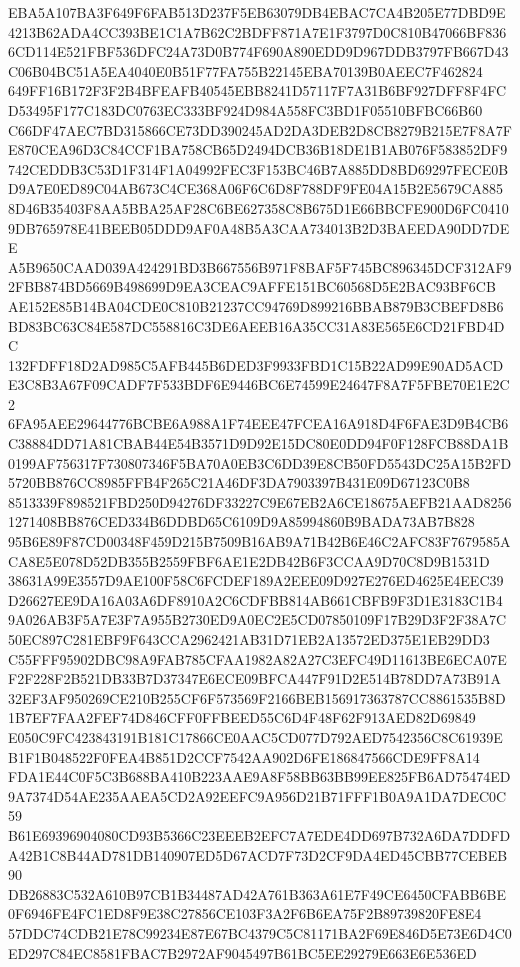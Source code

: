 \documentclass[UTF8,fontset=fandol,zihao=-4,a4paper]{ctexart}
\begin{document}
{{EBA5A107BA3F649F6FAB513D237F5EB63079DB4EBAC7CA4B205E77DBD9E4213B62ADA4CC393BE1C1A7B62C2BDFF871A7E1F3797D0C810B47066BF836
6CD114E521FBF536DFC24A73D0B774F690A890EDD9D967DDB3797FB667D43C06B04BC51A5EA4040E0B51F77FA755B22145EBA70139B0AEEC7F462824
649FF16B172F3F2B4BFEAFB40545EBB8241D57117F7A31B6BF927DFF8F4FCD53495F177C183DC0763EC333BF924D984A558FC3BD1F05510BFBC66B60
C66DF47AEC7BD315866CE73DD390245AD2DA3DEB2D8CB8279B215E7F8A7FE870CEA96D3C84CCF1BA758CB65D2494DCB36B18DE1B1AB076F583852DF9
742CEDDB3C53D1F314F1A04992FEC3F153BC46B7A885DD8BD69297FECE0BD9A7E0ED89C04AB673C4CE368A06F6C6D8F788DF9FE04A15B2E5679CA885
8D46B35403F8AA5BBA25AF28C6BE627358C8B675D1E66BBCFE900D6FC04109DB765978E41BEEB05DDD9AF0A48B5A3CAA734013B2D3BAEEDA90DD7DEE
A5B9650CAAD039A424291BD3B667556B971F8BAF5F745BC896345DCF312AF92FBB874BD5669B498699D9EA3CEAC9AFFE151BC60568D5E2BAC93BF6CB
AE152E85B14BA04CDE0C810B21237CC94769D899216BBAB879B3CBEFD8B6BD83BC63C84E587DC558816C3DE6AEEB16A35CC31A83E565E6CD21FBD4DC
132FDFF18D2AD985C5AFB445B6DED3F9933FBD1C15B22AD99E90AD5ACDE3C8B3A67F09CADF7F533BDF6E9446BC6E74599E24647F8A7F5FBE70E1E2C2
6FA95AEE29644776BCBE6A988A1F74EEE47FCEA16A918D4F6FAE3D9B4CB6C38884DD71A81CBAB44E54B3571D9D92E15DC80E0DD94F0F128FCB88DA1B
0199AF756317F730807346F5BA70A0EB3C6DD39E8CB50FD5543DC25A15B2FD5720BB876CC8985FFB4F265C21A46DF3DA7903397B431E09D67123C0B8
8513339F898521FBD250D94276DF33227C9E67EB2A6CE18675AEFB21AAD82561271408BB876CED334B6DDBD65C6109D9A85994860B9BADA73AB7B828
95B6E89F87CD00348F459D215B7509B16AB9A71B42B6E46C2AFC83F7679585ACA8E5E078D52DB355B2559FBF6AE1E2DB42B6F3CCAA9D70C8D9B1531D
38631A99E3557D9AE100F58C6FCDEF189A2EEE09D927E276ED4625E4EEC39D26627EE9DA16A03A6DF8910A2C6CDFBB814AB661CBFB9F3D1E3183C1B4
9A026AB3F5A7E3F7A955B2730ED9A0EC2E5CD07850109F17B29D3F2F38A7C50EC897C281EBF9F643CCA2962421AB31D71EB2A13572ED375E1EB29DD3
C55FFF95902DBC98A9FAB785CFAA1982A82A27C3EFC49D11613BE6ECA07EF2F228F2B521DB33B7D37347E6ECE09BFCA447F91D2E514B78DD7A73B91A
32EF3AF950269CE210B255CF6F573569F2166BEB156917363787CC8861535B8D1B7EF7FAA2FEF74D846CFF0FFBEED55C6D4F48F62F913AED82D69849
E050C9FC423843191B181C17866CE0AAC5CD077D792AED7542356C8C61939EB1F1B048522F0FEA4B851D2CCF7542AA902D6FE186847566CDE9FF8A14
FDA1E44C0F5C3B688BA410B223AAE9A8F58BB63BB99EE825FB6AD75474ED9A7374D54AE235AAEA5CD2A92EEFC9A956D21B71FFF1B0A9A1DA7DEC0C59
B61E69396904080CD93B5366C23EEEB2EFC7A7EDE4DD697B732A6DA7DDFDA42B1C8B44AD781DB140907ED5D67ACD7F73D2CF9DA4ED45CBB77CEBEB90
DB26883C532A610B97CB1B34487AD42A761B363A61E7F49CE6450CFABB6BE0F6946FE4FC1ED8F9E38C27856CE103F3A2F6B6EA75F2B89739820FE8E4
57DDC74CDB21E78C99234E87E67BC4379C5C81171BA2F69E846D5E73E6D4C0ED297C84EC8581FBAC7B2972AF9045497B61BC5EE29279E663E6E536ED
}}
\end{document}
